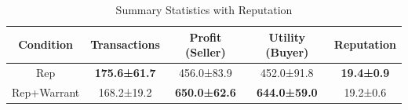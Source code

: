 \begin{table}[t]
    \centering
    \caption{Summary Statistics with Reputation}
    \label{tab:rq1_summary_stats}
    \begin{tabular}{ccccc}
    \toprule
    \textbf{Condition} & \textbf{Transactions} & \textbf{Profit (Seller)} & \textbf{Utility (Buyer)} & \textbf{Reputation} \\
    \midrule
    Rep & \textbf{175.6±61.7} & 456.0±83.9 & 452.0±91.8 & \textbf{19.4±0.9} \\
    Rep+Warrant & 168.2±19.2 & \textbf{650.0±62.6} & \textbf{644.0±59.0} & 19.2±0.6 \\
    \bottomrule
    \end{tabular}
\end{table}
